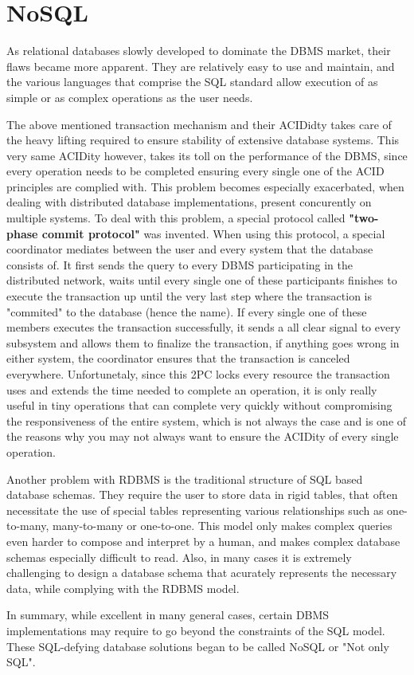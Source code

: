 \section{NoSQL}
\label{sec:background:second_section}
\par As relational databases slowly developed to dominate the DBMS market, their flaws became more apparent. They are relatively easy to use and maintain, and the various languages that comprise the SQL standard allow execution of as simple or as complex operations as the user needs. 
\par The above mentioned transaction mechanism and their ACIDidty takes care of the heavy lifting required to ensure stability of extensive database systems. This very same ACIDity however, takes its toll on the performance of the DBMS, since every operation needs to be completed ensuring every single one of the ACID principles are complied with. This problem becomes especially exacerbated, when dealing with distributed database implementations, present concurently on multiple systems\citep{HewittCassandra}. To deal with this problem, a special protocol called \textbf{"two-phase commit protocol"} was invented. When using this protocol, a special coordinator mediates between the user and every system that the database consists of. It first sends the query to every DBMS participating in the distributed network, waits until every single one of these participants finishes to execute the transaction up until the very last step where the transaction is "commited" to the database (hence the name). If every single one of these members executes the transaction successfully, it sends a all clear signal to every subsystem and allows them to finalize the transaction, if anything goes wrong in either system, the coordinator ensures that the transaction is canceled everywhere\citep{TwoPhaseCommit}. Unfortunetaly, since this 2PC locks every resource the transaction uses and extends the time needed to complete an operation, it is only really useful in tiny operations that can complete very quickly without compromising the responsiveness of the entire system, which is not always the case and is one of the reasons why you may not always want to ensure the ACIDity of every single operation\citep{HewittCassandra}.
\par Another problem with RDBMS is the traditional structure of SQL based database schemas. They require the user to store data in rigid tables, that often necessitate the use of special tables representing various relationships such as one-to-many, many-to-many or one-to-one. This model only makes complex queries even harder to compose and interpret by a human, and makes complex database schemas especially difficult to read. Also, in many cases it is extremely challenging to design a database schema that acurately represents the necessary data, while complying with the RDBMS model\citep{HewittCassandra}.
\par In summary, while excellent in many general cases, certain DBMS implementations may require to go beyond the constraints of the SQL model. These SQL-defying database solutions began to be called NoSQL or "Not only SQL"\citep{SQLvNOSQL}.

